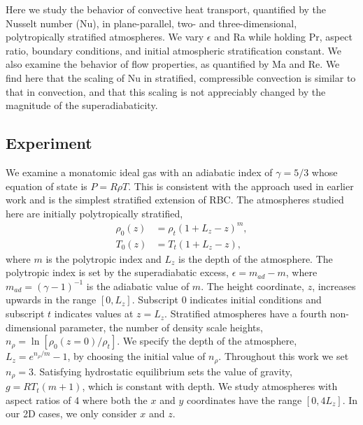 Here we study the behavior of convective heat transport, quantified by the Nusselt number (Nu), in plane-parallel, two- and three-dimensional, polytropically stratified atmospheres.  
We vary $\epsilon$ and Ra while holding Pr, aspect ratio, boundary conditions, and initial atmospheric stratification constant.  
We also examine the behavior of flow properties, as quantified by Ma and Re.
We find here that the scaling of Nu in stratified, compressible convection is similar to that in \RB convection, and that this scaling is not appreciably changed by the magnitude of the superadiabaticity.

\subsection{Experiment} 
\label{sec:experiment}
We examine a monatomic ideal gas with an adiabatic index of $\gamma = 5/3$ whose equation of state is $P = R\rho T$. 
This is consistent with the approach used in earlier work \citep{graham1975, chan&all1982, brandenburg&all2005, hurlburt&all1984, cattaneo&all1990, cattaneo&all1991, brummell&all1996}  and is the simplest stratified extension of RBC.
The atmospheres studied here are initially polytropically stratified,
\begin{equation}
\begin{split}
\rho_0(z) &= \rho_{t}(1 + L_z - z)^m, \\
T_0(z)    &= T_{t}(1 + L_z - z),
\label{eqn:ab17polytrope}
\end{split}
\end{equation}
where $m$ is the polytropic index and $L_z$ is the depth of the atmosphere.
The polytropic index is set by the superadiabatic excess, $\epsilon = m_{ad} - m$, where $m_{ad} = (\gamma - 1)^{-1}$ is the adiabatic value of $m$.
The height coordinate, $z$, increases upwards in the range $[0, L_z]$.
Subscript 0 indicates initial conditions and subscript $t$ indicates values at $z = L_z$.   
Stratified atmospheres have a fourth non-dimensional parameter, the number of density scale heights, $n_{\rho} = \ln\left[\rho_0(z=0)/\rho_t\right]$.  
We specify the depth of the atmosphere, $L_z = e^{n_{\rho}/m} - 1$, by choosing the initial value of $n_{\rho}$.
Throughout this work we set $n_{\rho} = 3$.    Satisfying hydrostatic equilibrium sets the value of gravity, $g = RT_t (m + 1)$, which is constant with depth.  
We study atmospheres with aspect ratios of 4 where both the $x$ and $y$ coordinates have the range $[0, 4L_z]$.
In our 2D cases, we only consider $x$ and $z$.

